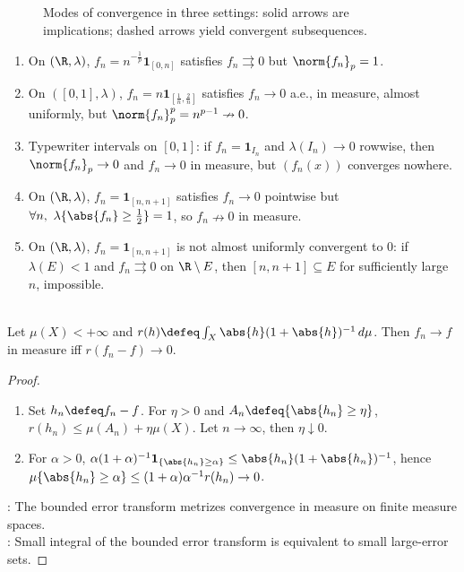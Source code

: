 \begin{figure}[H]
  \centering
  
  \caption{Modes of convergence in three settings: solid arrows are implications; dashed arrows yield convergent subsequences.}
  \label{fig:modes-convergence-implication-diagrams}
\end{figure}

\begin{method} \label{meth:modes-of-convergence-counterexample-dictionary} 
\begin{enumerate}[label=(\roman*)]
\setlength{\itemsep}{0pt}
\item On $(\R,\lambda)$, $f_n=n^{-\frac{1}{p}}\mathbf{1}_{[0,n]}$ satisfies $f_n\rightrightarrows0$ but $\norm{f_n}_p=1$.
\item On $([0,1],\lambda)$, $f_n=n\mathbf{1}_{[\frac{1}{n},\frac{2}{n}]}$ satisfies $f_n\to0$ a.e., in measure, almost uniformly, but $\norm{f_n}_p^p=n^{p-1}\nrightarrow0$.
\item Typewriter intervals on $[0,1]$: if $f_n=\mathbf{1}_{I_n}$ and $\lambda(I_n)\to0$ rowwise, then $\norm{f_n}_p\to0$ and $f_n\to0$ in measure, but $(f_n(x))$ converges nowhere.
\item On $(\R,\lambda)$, $f_n=\mathbf{1}_{[n,n+1]}$ satisfies $f_n\to0$ pointwise but $\forall n,\ \lambda\{\abs{f_n}\geq\frac{1}{2}\}=1$, so $f_n\nrightarrow0$ in measure.
\item On $(\R,\lambda)$, $f_n=\mathbf{1}_{[n,n+1]}$ is not almost uniformly convergent to $0$: if $\lambda(E)<1$ and $f_n\rightrightarrows0$ on $\R\setminus E$, then $[n,n+1]\subseteq E$ for sufficiently large $n$, impossible.
\end{enumerate}
\end{method}

\begin{proposition} \label{prop:finite-measure-integral-metric-for-measure-convergence} \\
Let $\mu(X)<+\infty$ and $r(h)\defeq\int_X\abs{h}(1+\abs{h})^{-1}\,d\mu$. Then $f_n\to f$ in measure iff $r(f_n-f)\to0$.
\begin{proof}
\begin{enumerate}[label=\roman*.]
\setlength{\itemsep}{0pt}
\item[$(\Rightarrow)$] Set $h_n\defeq f_n-f$. For $\eta>0$ and $A_n\defeq\{\abs{h_n}\geq\eta\}$, $r(h_n)\leq\mu(A_n)+\eta\mu(X)$. Let $n\to\infty$, then $\eta\downarrow0$.
\item[$(\Leftarrow)$] For $\alpha>0$, $\alpha(1+\alpha)^{-1}\mathbf{1}_{\{\abs{h_n}\geq\alpha\}}\leq\abs{h_n}(1+\abs{h_n})^{-1}$, hence $\mu\{\abs{h_n}\geq\alpha\}\leq(1+\alpha)\alpha^{-1}r(h_n)\to0$.
\end{enumerate}
: The bounded error transform metrizes convergence in measure on finite measure spaces.\\
: Small integral of the bounded error transform is equivalent to small large-error sets.
\end{proof}
\end{proposition}

